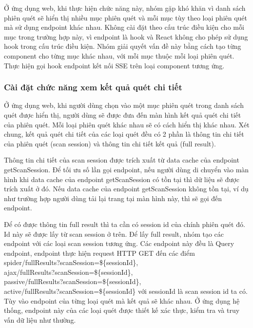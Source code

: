 Ở ứng dụng web, khi thực hiện chức năng này, nhóm gặp khó khăn vì danh sách phiên quét sẽ hiển thị nhiều mục phiên quét và mỗi mục tùy theo loại phiên quét mà sử dụng endpoint khác nhau. Không cài đặt theo cấu trúc điều kiện cho mỗi mục trong trường hợp này, vì endpoint là hook và React không cho phép sử dụng hook trong cấu trúc điều kiện. Nhóm giải quyết vấn đề này bằng cách tạo từng component cho từng mục khác nhau, với mỗi mục thuộc mỗi loại phiên quét. Thực hiện gọi hook endpoint kết nối SSE trên loại component tương ứng.

\subsubsection{Cài đặt chức năng xem kết quả quét chi tiết} \label{subsubsec:CaiDatChucNangXemKetQuaQuetChiTiet}

\tab Ở ứng dụng web, khi người dùng chọn vào một mục phiên quét trong danh sách quét được hiển thị, người dùng sẽ được đưa đến màn hình kết quả quét chi tiết của phiên quét.
Mỗi loại phiên quét khác nhau sẽ có cách hiển thị khác nhau.
Xét chung, kết quả quét chi tiết của các loại quét đều có 2 phần là thông tin chi tiết của phiên quét (scan session) và thông tin chi tiết kết quả (full result).

Thông tin chi tiết của scan session được trích xuất từ data cache của endpoint getScanSession.
Để tối ưu số lần gọi endpoint, nếu người dùng di chuyển vào màn hình khi data cache của endpoint getScanSession có tồn tại thì dữ liệu sẽ được trích xuất ở đó.
Nếu data cache của endpoint getScanSession không tồn tại, ví dụ như trường hợp người dùng tải lại trang tại màn hình này, thì sẽ gọi đến endpoint.

Để có được thông tin full result thì ta cần có session id của chính phiên quét đó.
Id này sẽ được lấy từ scan session ở trên.
Để lấy full result, nhóm tạo các endpoint với các loại scan session tương ứng.
Các endpoint này đều là Query endpoint, endpoint thực hiện request HTTP GET đến các điểm \\
spider/fullResults?scanSession=\$\{sessionId\},\\
ajax/fullResults?scanSession=\$\{sessionId\},\\
passive/fullResults?scanSession=\$\{sessionId\},\\
active/fullResults?scanSession=\$\{sessionId\} với sessionId là scan session id ta có.
Tùy vào endpoint của từng loại quét mà kết quả sẽ khác nhau. Ở ứng dụng hệ thống, endpoint này của các loại quét được thiết kế xác thực, kiểm tra và truy vấn dữ liệu như thường.

